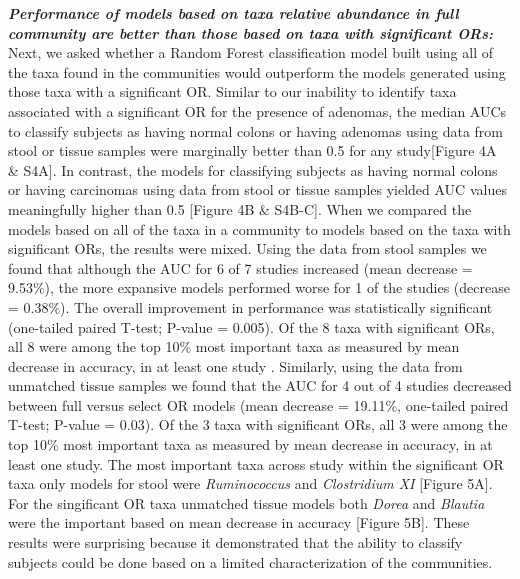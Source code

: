 \documentclass[12pt,]{article}
\begin{document}
\textbf{\emph{Performance of models based on taxa relative abundance in
full community are better than those based on taxa with significant
ORs:}} Next, we asked whether a Random Forest classification model built
using all of the taxa found in the communities would outperform the
models generated using those taxa with a significant OR. Similar to our
inability to identify taxa associated with a significant OR for the
presence of adenomas, the median AUCs to classify subjects as having
normal colons or having adenomas using data from stool or tissue samples
were marginally better than 0.5 for any study{[}Figure 4A \& S4A{]}. In
contrast, the models for classifying subjects as having normal colons or
having carcinomas using data from stool or tissue samples yielded AUC
values meaningfully higher than 0.5 {[}Figure 4B \& S4B-C{]}. When we
compared the models based on all of the taxa in a community to models
based on the taxa with significant ORs, the results were mixed. Using
the data from stool samples we found that although the AUC for 6 of 7
studies increased (mean decrease = 9.53\%), the more expansive models
performed worse for 1 of the studies (decrease = 0.38\%). The overall
improvement in performance was statistically significant (one-tailed
paired T-test; P-value = 0.005). Of the 8 taxa with significant ORs, all
8 were among the top 10\% most important taxa as measured by mean
decrease in accuracy, in at least one study . Similarly, using the data
from unmatched tissue samples we found that the AUC for 4 out of 4
studies decreased between full versus select OR models (mean decrease =
19.11\%, one-tailed paired T-test; P-value = 0.03). Of the 3 taxa with
significant ORs, all 3 were among the top 10\% most important taxa as
measured by mean decrease in accuracy, in at least one study. The most
important taxa across study within the significant OR taxa only models
for stool were \emph{Ruminococcus} and \emph{Clostridium XI} {[}Figure
5A{]}. For the singificant OR taxa unmatched tissue models both
\emph{Dorea} and \emph{Blautia} were the important based on mean
decrease in accuracy {[}Figure 5B{]}. These results were surprising
because it demonstrated that the ability to classify subjects could be
done based on a limited characterization of the communities.
\end{document}

